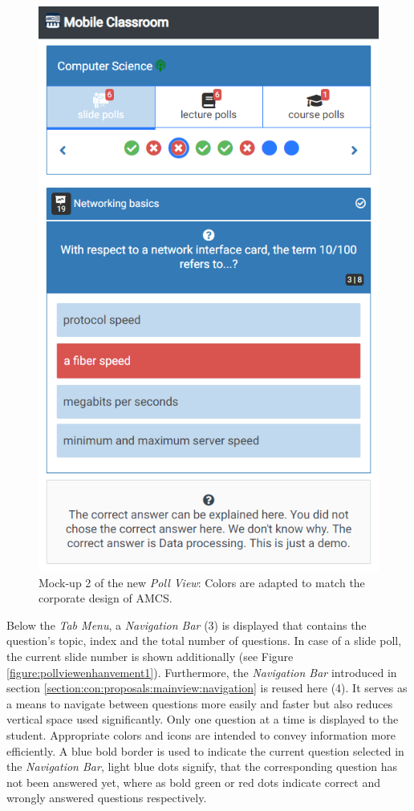 \begin{figure}[ht]
	\begin{minipage}[t]{\textwidth}
		\centering
		\includegraphics[width=.7\textwidth]{mockups/poll_view_enhancement_v2.png}
		\captionsetup{width=.8\linewidth}
		\caption{Mock-up 2 of the new \emph{Poll View}:
			Colors are adapted to match the corporate design of AMCS.
		}
		\label{figure:pollviewenhanvement2}
	\end{minipage}
\end{figure}
Below the \emph{Tab Menu}, a \emph{Navigation Bar} (3) is displayed that contains the question's topic, index and the total number of questions. In case of a slide poll, the current slide number is shown additionally (see Figure \ref{figure:pollviewenhanvement1}).
Furthermore, the \emph{Navigation Bar} introduced in section \ref{section:con:proposals:mainview:navigation} is reused here (4). It serves as a means to navigate between questions more easily and faster but also reduces vertical space used significantly. Only one question at a time is displayed to the student. Appropriate colors and icons are intended to convey information more efficiently. A blue bold border is used to indicate the current question selected in the \emph{Navigation Bar}, light blue dots signify, that the corresponding question has not been answered yet, where as bold green  or red dots indicate correct and wrongly answered questions respectively. 
